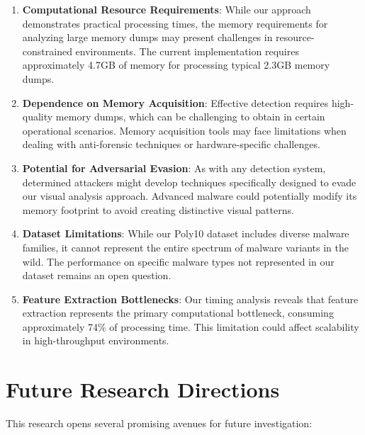 \begin{enumerate}
    \item \textbf{Computational Resource Requirements}: While our approach demonstrates practical processing times, the memory requirements for analyzing large memory dumps may present challenges in resource-constrained environments. The current implementation requires approximately 4.7GB of memory for processing typical 2.3GB memory dumps.
    
    \item \textbf{Dependence on Memory Acquisition}: Effective detection requires high-quality memory dumps, which can be challenging to obtain in certain operational scenarios. Memory acquisition tools may face limitations when dealing with anti-forensic techniques or hardware-specific challenges.
    
    \item \textbf{Potential for Adversarial Evasion}: As with any detection system, determined attackers might develop techniques specifically designed to evade our visual analysis approach. Advanced malware could potentially modify its memory footprint to avoid creating distinctive visual patterns.
    
    \item \textbf{Dataset Limitations}: While our Poly10 dataset includes diverse malware families, it cannot represent the entire spectrum of malware variants in the wild. The performance on specific malware types not represented in our dataset remains an open question.
    
    \item \textbf{Feature Extraction Bottlenecks}: Our timing analysis reveals that feature extraction represents the primary computational bottleneck, consuming approximately 74\% of processing time. This limitation could affect scalability in high-throughput environments.
\end{enumerate}

\section{Future Research Directions}

This research opens several promising avenues for future investigation:

